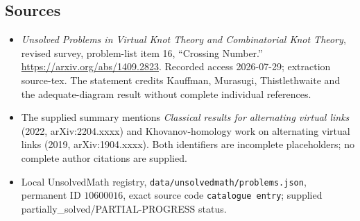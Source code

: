 \documentclass[11pt]{article}
\begin{document}
\subsection{Sources}
\begin{itemize}
\item \emph{Unsolved Problems in Virtual Knot Theory and Combinatorial Knot Theory}, revised survey, problem-list item 16, ``Crossing Number.'' \url{https://arxiv.org/abs/1409.2823}. Recorded access 2026-07-29; extraction source-tex. The statement credits Kauffman, Murasugi, Thistlethwaite and the adequate-diagram result without complete individual references.
\item The supplied summary mentions \emph{Classical results for alternating virtual links} (2022, arXiv:2204.xxxx) and Khovanov-homology work on alternating virtual links (2019, arXiv:1904.xxxx). Both identifiers are incomplete placeholders; no complete author citations are supplied.
\item Local UnsolvedMath registry, \texttt{data/unsolvedmath/problems.json}, permanent ID \(10600016\), exact source code \texttt{catalogue entry}; supplied partially\_solved/PARTIAL-PROGRESS status.
\end{itemize}
\end{document}
